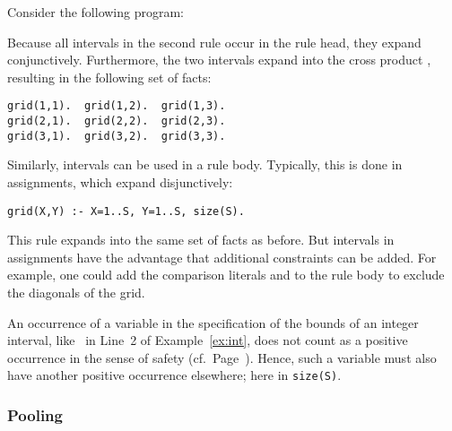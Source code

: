 \begin{example}\label{ex:int}
Consider the following program:

Because all intervals in the second rule occur in the rule head,
they expand conjunctively.
Furthermore, the two intervals expand into the cross product ,
resulting in the following set of facts:
\begin{lstlisting}[numbers=none]
grid(1,1).  grid(1,2).  grid(1,3).
grid(2,1).  grid(2,2).  grid(2,3).
grid(3,1).  grid(3,2).  grid(3,3).
\end{lstlisting}
Similarly, intervals can be used in a rule body.
Typically, this is done in assignments, which expand disjunctively:
\begin{lstlisting}[firstnumber=2]
grid(X,Y) :- X=1..S, Y=1..S, size(S).
\end{lstlisting}
This rule expands into the same set of facts as before.
But intervals in assignments have the advantage that additional constraints can be added.
For example, one could add the comparison literals  and 
to the rule body to exclude the diagonals of the grid.
\eexample
\end{example}

\begin{note}
An occurrence of a variable in the specification of the bounds
of an integer interval, like~ in Line~2 of Example~\ref{ex:int},
does not count as a positive occurrence
in the sense of safety (cf.\ Page~\pageref{pg:safe}).
Hence, such a variable must also have another positive occurrence elsewhere;
here in \lstinline{size(S)}.
%
\end{note}

\subsubsection{Pooling}\label{subsec:gringo:pool}

